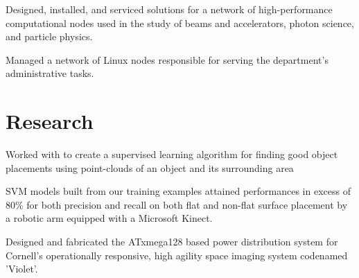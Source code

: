 \documentclass[]{deedy-resume-openfont}
\begin{document}
    \begin{tightemize}
        \item
            Designed, installed, and serviced solutions for a network of
            high-performance computational nodes used in the study of beams
            and accelerators, photon science, and particle physics.
        \item
            Managed a network of Linux nodes responsible for serving the
            department’s administrative tasks.
    \end{tightemize}
\sectionsep

\section{Research}
            \begin{tightemize}
                \item
                    Worked with  to create a supervised learning
                    algorithm for finding good object placements using
                    point-clouds of an object and its surrounding area
                \item
                    SVM models built from our training examples attained
                    performances in excess of 80\% for both precision and
                    recall on both flat and non-flat surface placement by 
                    a robotic arm
                    equipped with a Microsoft Kinect.
            \end{tightemize}
    \sectionsep

            \begin{tightemize}
                \item
                    Designed and fabricated the ATxmega128 based power
                    distribution system for Cornell’s operationally responsive,
                    high agility space imaging system codenamed 'Violet'.
            \end{tightemize}
    \sectionsep
\end{document}
